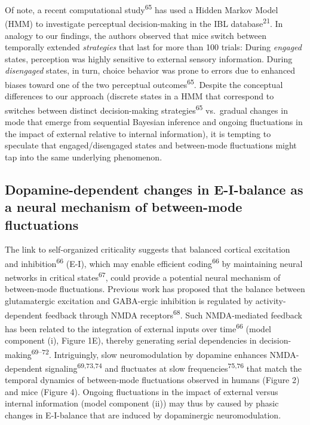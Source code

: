\documentclass[
]{article}
\begin{document}
Of note, a recent computational study\textsuperscript{65} has used a
Hidden Markov Model (HMM) to investigate perceptual decision-making in
the IBL database\textsuperscript{21}. In analogy to our findings, the
authors observed that mice switch between temporally extended
\emph{strategies} that last for more than 100 trials: During
\emph{engaged} states, perception was highly sensitive to external
sensory information. During \emph{disengaged} states, in turn, choice
behavior was prone to errors due to enhanced biases toward one of the
two perceptual outcomes\textsuperscript{65}. Despite the conceptual
differences to our approach (discrete states in a HMM that correspond to
switches between distinct decision-making strategies\textsuperscript{65}
vs.~gradual changes in mode that emerge from sequential Bayesian
inference and ongoing fluctuations in the impact of external relative to
internal information), it is tempting to speculate that
engaged/disengaged states and between-mode fluctuations might tap into
the same underlying phenomenon.

\hypertarget{dopamine-dependent-changes-in-e-i-balance-as-a-neural-mechanism-of-between-mode-fluctuations}{%
\subsection{Dopamine-dependent changes in E-I-balance as a neural
mechanism of between-mode
fluctuations}\label{dopamine-dependent-changes-in-e-i-balance-as-a-neural-mechanism-of-between-mode-fluctuations}}

The link to self-organized criticality suggests that balanced cortical
excitation and inhibition\textsuperscript{66} (E-I), which may enable
efficient coding\textsuperscript{66} by maintaining neural networks in
critical states\textsuperscript{67}, could provide a potential neural
mechanism of between-mode fluctuations. Previous work has proposed that
the balance between glutamatergic excitation and GABA-ergic inhibition
is regulated by activity-dependent feedback through NMDA
receptors\textsuperscript{68}. Such NMDA-mediated feedback has been
related to the integration of external inputs over
time\textsuperscript{66} (model component (i), Figure 1E), thereby
generating serial dependencies in
decision-making\textsuperscript{69--72}. Intriguingly, slow
neuromodulation by dopamine enhances NMDA-dependent
signaling\textsuperscript{69,73,74} and fluctuates at slow
frequencies\textsuperscript{75,76} that match the temporal dynamics of
between-mode fluctuations observed in humans (Figure 2) and mice (Figure
4). Ongoing fluctuations in the impact of external versus internal
information (model component (ii)) may thus by caused by phasic changes
in E-I-balance that are induced by dopaminergic neuromodulation.
\end{document}
